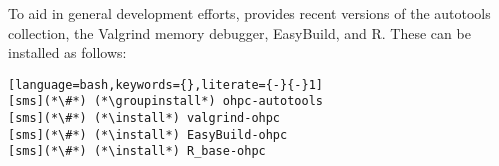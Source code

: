 To aid in general development efforts, \OHPC{} provides recent versions of the \GNU{}
autotools collection, the Valgrind memory debugger, EasyBuild, and R. These can be installed as follows:

\begin{lstlisting}[language=bash,keywords={},literate={-}{-}1]
[sms](*\#*) (*\groupinstall*) ohpc-autotools
[sms](*\#*) (*\install*) valgrind-ohpc
[sms](*\#*) (*\install*) EasyBuild-ohpc
[sms](*\#*) (*\install*) R_base-ohpc            
\end{lstlisting}
